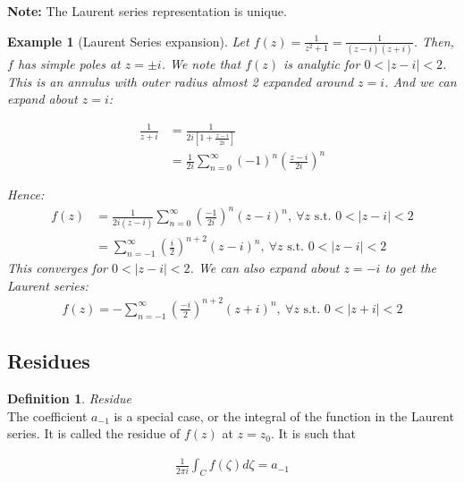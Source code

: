 \documentclass{article}
\newtheorem{ex}{Example}
\theoremstyle{definition}
\newtheorem{definition}{Definition}[section]
\newcommand{\Def}[2]{
\begin{shaded*}
\begin{definition}{\textit{#1}}\\#2\end{definition}
\end{shaded*}
}
\begin{document}
\textbf{Note:} The Laurent series representation is unique. 


\begin{ex}[Laurent Series expansion]
	Let $f(z) = \frac{1}{z^2 +1} = \frac{1}{(z-i)(z+i)}$. Then, $f$ has simple poles at $z=\pm i$. We note that $f(z)$ is analytic for $0 < |z-i| < 2$. This is an annulus with outer radius almost 2 expanded around $z=i$. And we can expand about $z=i$:
	
	\begin{align*}
	\frac{1}{z+i} &= \frac{1}{2i[1 + \frac{z-i}{2i}]} \\
	&= \frac{1}{2i}\sum_{n=0}^\infty (-1)^n \left(\frac{z-i}{2i}\right)^n
	\end{align*}
	
	Hence:
	\begin{align*}
	f(z) &= \frac{1}{2i(z-i)} \sum_{n=0}^\infty \left(\frac{-1}{2i}\right)^n (z-i)^n,\  \forall z \text{ s.t. } 0 < |z-i| < 2 \\ 
	&= \sum_{n=-1}^\infty \left(\frac{i}{2}\right)^{n+2} (z-i)^n,\ \forall z \text{ s.t. }0 < |z-i| < 2
	\end{align*}
	This converges for $0 < |z-i| < 2$. We can also expand about $z=-i$ to get the Laurent series:
	\begin{align*}
	f(z) = - \sum_{n=-1}^\infty \left(\frac{-i}{2}\right)^{n+2} (z+i)^n,\ \forall z \text{ s.t. }0 < |z+i| < 2
	\end{align*} 
\end{ex}


\subsection{Residues}
\Def{Residue}{The coefficient $a_{-1}$ is a special case, or the integral of the function in the Laurent series. It is called the residue of $f(z)$ at $z=z_0$. It is such that 

\begin{align*}
\frac{1}{2\pi i}\int_C f(\zeta) d\zeta = a_{-1}
\end{align*}

}
\end{document}
